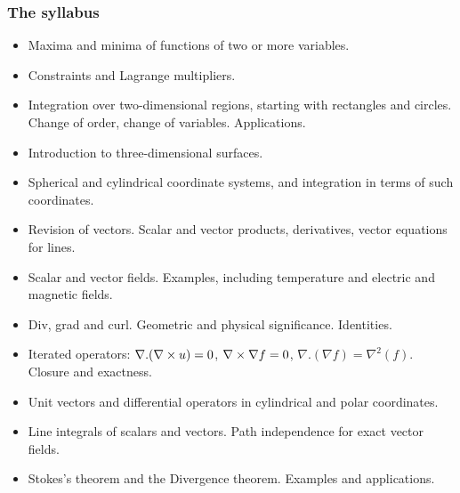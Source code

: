\documentclass[9pt]{beamer}
\begin{document}
\begin{frame}[t]
 \frametitle{The syllabus}
 \begin{itemize}
  \item<1->Maxima and minima of functions of two or more variables.
  \item<2->Constraints and Lagrange multipliers.
  \item<3->Integration over two-dimensional regions, starting with
   rectangles and circles.  Change of order, change of variables.
   Applications.
  \item<4->Introduction to three-dimensional surfaces.
  \item<5-> Spherical and cylindrical coordinate systems, and integration
   in terms of such coordinates.
  \item<6->Revision of vectors.  Scalar and vector products, derivatives,
   vector equations for lines.
  \item<7->Scalar and vector fields.  Examples, including temperature and
   electric and magnetic fields.
  \item<8->Div, grad and curl.  Geometric and physical significance.  Identities. 
  \item<9->Iterated operators: $\nabla.(\nabla\times u)=0$,
   $\nabla\times\nabla f=0$, $\nabla.(\nabla f)=\nabla^2(f)$.  Closure and
   exactness.
  \item<10->Unit vectors and differential operators in cylindrical and
   polar coordinates.
  \item<11->Line integrals of scalars and vectors.  Path independence for
   exact vector fields.
  \item<12->Stokes's theorem and the Divergence theorem.  Examples and
   applications.
 \end{itemize}
\end{frame}
\end{document}
